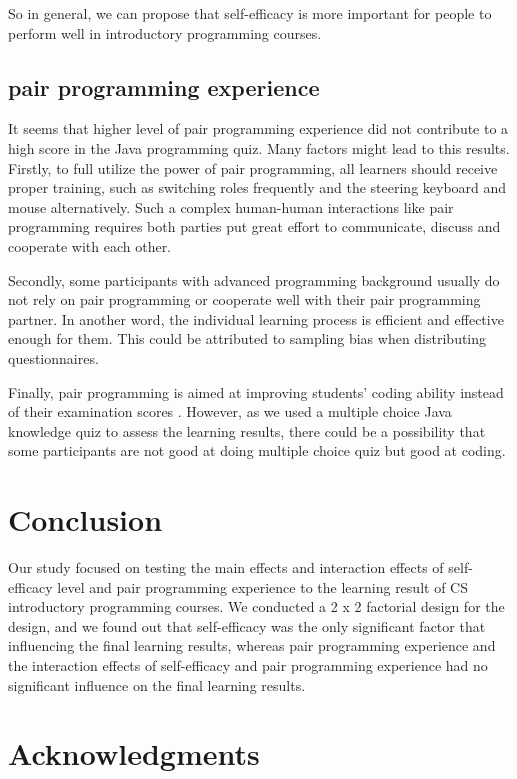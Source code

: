 \documentclass{sigchi}
\begin{document}
So in general, we can propose that self-efficacy is more important for people to perform well in introductory programming courses.

\subsection{pair programming experience}
It seems that higher level of pair programming experience did not contribute to a high score in the Java programming quiz. Many factors might lead to this results. Firstly, to full utilize the power of pair programming, all learners should receive proper training, such as switching roles frequently and the steering keyboard and mouse alternatively. Such a complex human-human interactions like pair programming requires both parties put great effort to communicate, discuss and cooperate with each other.

Secondly, some participants with advanced programming background usually do not rely on pair programming or cooperate well with their pair programming partner. In another word, the individual learning process is efficient and effective enough for them. This could be attributed to sampling bias when distributing questionnaires.

Finally, pair programming is aimed at improving students’ coding ability instead of their examination scores \cite{de2016pair}. However, as we used a multiple choice Java knowledge quiz to assess the learning results, there could be a possibility that some participants are not good at doing multiple choice quiz but good at coding.


\section{Conclusion}
Our study focused on testing the main effects and interaction effects of self-efficacy level and pair programming experience to the learning result of CS introductory programming courses. We conducted a 2 x 2 factorial design for the design, and we found out that self-efficacy was the only significant factor that influencing the final learning results, whereas pair programming experience and the interaction effects of self-efficacy and pair programming experience had no significant influence on the final learning results.

\section{Acknowledgments}
\end{document}
